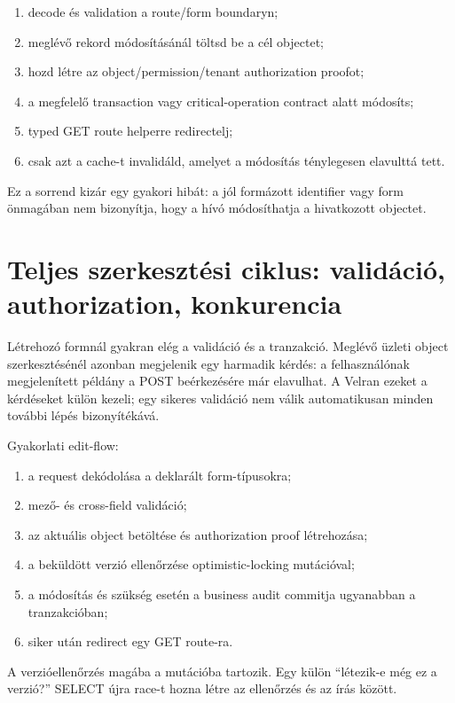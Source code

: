 \begin{enumerate}
  \item decode és validation a route/form boundaryn;
  \item meglévő rekord módosításánál töltsd be a cél objectet;
  \item hozd létre az object/permission/tenant authorization proofot;
  \item a megfelelő transaction vagy critical-operation contract alatt módosíts;
  \item typed GET route helperre redirectelj;
  \item csak azt a cache-t invalidáld, amelyet a módosítás ténylegesen elavulttá tett.
\end{enumerate}

Ez a sorrend kizár egy gyakori hibát: a jól formázott identifier vagy form önmagában nem bizonyítja, hogy a hívó módosíthatja a hivatkozott objectet.


\section{Teljes szerkesztési ciklus: validáció, authorization, konkurencia}

Létrehozó formnál gyakran elég a validáció és a tranzakció. Meglévő üzleti object szerkesztésénél azonban megjelenik egy harmadik kérdés: a felhasználónak megjelenített példány a POST beérkezésére már elavulhat. A Velran ezeket a kérdéseket külön kezeli; egy sikeres validáció nem válik automatikusan minden további lépés bizonyítékává.

Gyakorlati edit-flow:

\begin{enumerate}
  \item a request dekódolása a deklarált form-típusokra;
  \item mező- és cross-field validáció;
  \item az aktuális object betöltése és authorization proof létrehozása;
  \item a beküldött verzió ellenőrzése optimistic-locking mutációval;
  \item a módosítás és szükség esetén a business audit commitja ugyanabban a tranzakcióban;
  \item siker után redirect egy GET route-ra.
\end{enumerate}

A verzióellenőrzés magába a mutációba tartozik. Egy külön ``létezik-e még ez a verzió?'' SELECT újra race-t hozna létre az ellenőrzés és az írás között.

